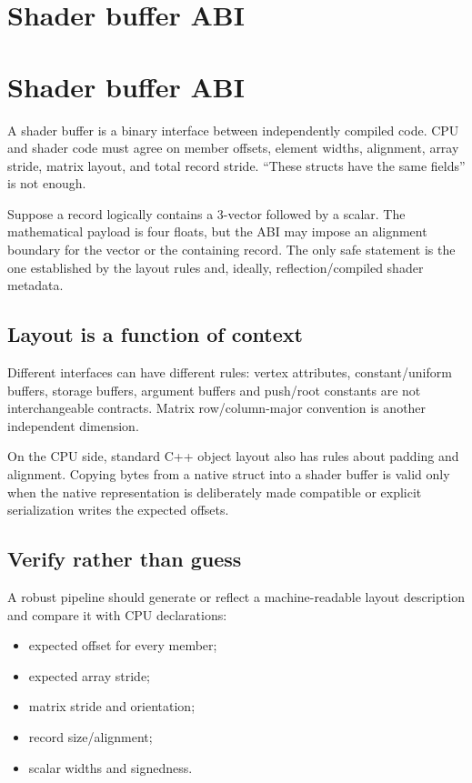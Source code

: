 \hypertarget{appendix-749048795dbb}{}
\section*{Shader buffer ABI}
\section{Shader buffer ABI}\label{appendix-749048795dbb-shader-buffer-abi}

A shader buffer is a binary interface between independently compiled code. CPU and shader code must agree on member offsets, element widths, alignment, array stride, matrix layout, and total record stride. ``These structs have the same fields'' is not enough.

Suppose a record logically contains a 3-vector followed by a scalar. The mathematical payload is four floats, but the ABI may impose an alignment boundary for the vector or the containing record. The only safe statement is the one established by the layout rules and, ideally, reflection/compiled shader metadata.

\subsection{Layout is a function of context}\label{appendix-749048795dbb-layout-is-a-function-of-context}

Different interfaces can have different rules: vertex attributes, constant/uniform buffers, storage buffers, argument buffers and push/root constants are not interchangeable contracts. Matrix row/column-major convention is another independent dimension.

On the CPU side, standard C++ object layout also has rules about padding and alignment. Copying bytes from a native struct into a shader buffer is valid only when the native representation is deliberately made compatible or explicit serialization writes the expected offsets.

\subsection{Verify rather than guess}\label{appendix-749048795dbb-verify-rather-than-guess}

A robust pipeline should generate or reflect a machine-readable layout description and compare it with CPU declarations:

\begin{itemize}
\tightlist
\item
  expected offset for every member;
\item
  expected array stride;
\item
  matrix stride and orientation;
\item
  record size/alignment;
\item
  scalar widths and signedness.
\end{itemize}

